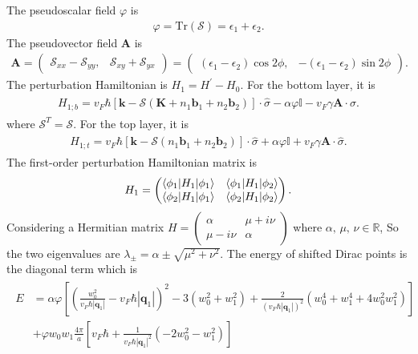 \documentclass[10pt, oneside]{article}
\newcommand{\vph}{\varphi}
\newcommand{\pr}{\prime}
\newcommand{\mr}[1]{\mathrm{#1}}
\newcommand{\p}[1]{\left(#1\right)}
\newcommand{\bb}[1]{\left[#1\right]}
\newcommand{\bv}[1]{\left|#1\right|}
\begin{document}
The pseudoscalar field \(\vph\) is 
\begin{align}
	\vph = \mr{Tr}\p{\mathcal{S}} = \epsilon_1 + \epsilon_2.
\end{align}
The pseudovector field  \(\bm{A}\) is 
\begin{align}
	\bm{A} = \begin{pmatrix}
		\mathcal{S}_{xx} - \mathcal{S}_{yy},&  \mathcal{S}_{xy} + \mathcal{S}_{yx}
	\end{pmatrix}  = \begin{pmatrix}
		\p{\epsilon_1 - \epsilon_2} \cos{2 \phi},& -\p{\epsilon_1 - \epsilon_2} \sin{2 \phi}
	\end{pmatrix}.
\end{align}
The perturbation Hamiltonian is \(H_{1} = H^{\pr} - H_{0}\). For the bottom layer, it is
\begin{align}
	\begin{split}
		H_{1;b} = v_F \hbar \bb{ \bm{k} - \mathcal{S} \p{\bm{K} + n_1 \bm{b}_{1} + n_2 \bm{b}_{2}}} \cdot \hat{\sigma} - \alpha \vph \mathbb{I} - v_F \gamma \bm{A} \cdot \hat{\sigma}.
	\end{split}
\end{align}
where \(\mathcal{S}^{T} = \mathcal{S}\). For the top layer, it is
\begin{align}
	\begin{split}
		H_{1;t}  = v_F \hbar \bb{\bm{k} - \mathcal{S} \p{n_1 \bm{b}_{1} + n_2 \bm{b}_{2}}}  \cdot \hat{\sigma} + \alpha\vph \mathbb{I} + v_F\gamma\bm{A}\cdot\hat{\sigma}.		
	\end{split}
\end{align}
The first-order perturbation Hamiltonian matrix is 
\begin{align}
	H_{1}  = \begin{pmatrix}
		\braket{\phi_{1} | H_{1} | \phi_{1}} & \braket{\phi_{1} | H_{1} | \phi_{2}} \\
		\braket{\phi_{2} | H_{1} | \phi_{1}} & \braket{\phi_{2} | H_{1} | \phi_{2}}
	\end{pmatrix}.
\end{align}
Considering a Hermitian matrix \(H = \begin{pmatrix}
		\alpha & \mu + i \nu \\
		\mu - i \nu & \alpha
\end{pmatrix}\) where \(\alpha,\, \mu, \, \nu \in \mathbb{R}\), So the two eigenvalues are \(\lambda_{\pm} = \alpha \pm \sqrt{\mu^2 + \nu^2}\). The energy of shifted Dirac points is the diagonal term which is 
\begin{align}
	\boxed{
		\begin{aligned}
		E &= \alpha \vph \bb{\p{\frac{w_0^2}{v_{F} \hbar \bv{\bm{q}_1}} - v_{F} \hbar \bv{\bm{q}_1}}^2 - 3 \p{w_0^2 + w_1^2} + \frac{2}{ \p{v_{F} \hbar \bv{\bm{q}_1}}^2} \p{w_0^4 + w_1^4 + 4 w_0^2 w_1^2}}\\
		&+ \vph w_0 w_1 \frac{4 \pi}{a}  \bb{v_{F} \hbar + \frac{1}{v_{F} \hbar \bv{\bm{q}_{1}}^2} \p{-2 w_0^2 - w_1^2}}  
	\end{aligned}
	}
\end{align} 
\end{document}
